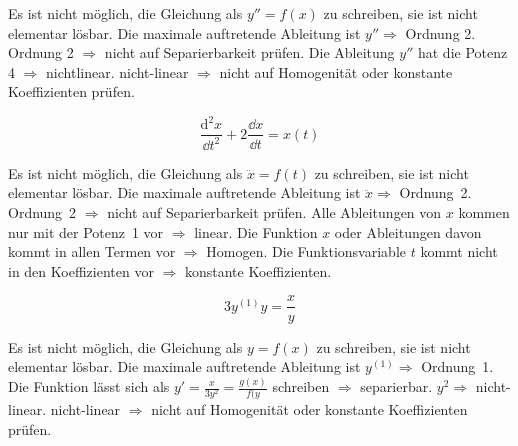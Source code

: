 \begin{outline}
    \1[a)] Es ist nicht möglich, die Gleichung als $y''=f(x)$ zu schreiben, sie
           ist nicht elementar lösbar.
    \1[b)] Die maximale auftretende Ableitung ist $y''\Rightarrow$ Ordnung 2.
        \2 Ordnung 2 $\Rightarrow$ nicht auf Separierbarkeit prüfen.
    \1[c)] Die Ableitung $y''$ hat die Potenz 4 $\Rightarrow$ nichtlinear.
        \2 nicht-linear $\Rightarrow$ nicht auf Homogenität oder konstante
           Koeffizienten prüfen.
\end{outline}

\begin{equation*}
    \frac{\mathrm{d}^2x}{ \dd{t} ^{2}} + 2
    \frac{\dd{x}}{ \dd{t} } = x\left( t \right)
\end{equation*}

\begin{outline}
    \1[a)] Es ist nicht möglich, die Gleichung als $\ddot{x}=f(t)$ zu 
           schreiben, sie ist nicht elementar lösbar.
    \1[b)] Die maximale auftretende Ableitung ist $\ddot{x}\Rightarrow$ 
           Ordnung~2.
        \2 Ordnung~2 $\Rightarrow$ nicht auf Separierbarkeit prüfen.
    \1[c)] Alle Ableitungen von $x$ kommen nur mit der Potenz~1 vor
           $\Rightarrow$ linear.
        \2 Die Funktion $x$ oder Ableitungen davon kommt in allen Termen 
           vor $\Rightarrow$ Homogen.
        \2 Die Funktionsvariable $t$ kommt nicht in den Koeffizienten vor
           $\Rightarrow$ konstante Koeffizienten.
\end{outline}

\begin{equation*}
    3y^{(1)} y= \frac{x}{y}
\end{equation*}

\begin{outline}
    \1[a)] Es ist nicht möglich, die Gleichung als $y=f(x)$ zu schreiben, sie
       ist nicht elementar lösbar.
    \1[b)] Die maximale auftretende Ableitung ist $y^{(1)} \Rightarrow$ 
           Ordnung~1.
        \2 Die Funktion lässt sich als $y' = \frac{x}{3y^2}=\frac{g(x)}{f(y}$
            schreiben $\Rightarrow$ separierbar.
    \1[c)] $y^2 \Rightarrow$ nicht-linear.
        \2 nicht-linear $\Rightarrow$ nicht auf Homogenität oder konstante
           Koeffizienten prüfen.
\end{outline}
